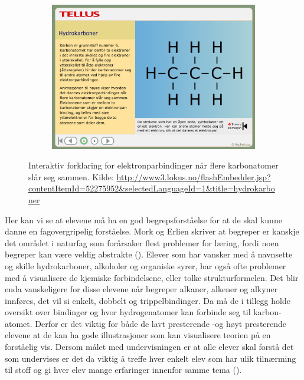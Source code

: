 \documentclass[main.tex]{subfiles}
\begin{document}
\begin{figure}[h!]
\begin{subfigure}{.5\textwidth}
    \end{subfigure}%
    \begin{subfigure}{.5\textwidth}
    \centering
    \includegraphics[scale = 0.199]{../figures/lokus4.png}
    \end{subfigure}
    \caption{Interaktiv forklaring for elektronparbindinger når flere karbonatomer slår seg sammen. Kilde: 
    \protect\url{http://www3.lokus.no/flashEmbedder.jsp?contentItemId=52275952&selectedLanguageId=1&title=hydrokarboner}}
    \label{fig:lokus}
\end{figure}

\hspace{-6mm}Her kan vi se at elevene må ha en god begrepsforståelse for at de skal kunne danne en fagovergripelig forståelse. Mork og Erlien skriver at begreper er kanskje det området i naturfag som forårsaker flest problemer for læring, fordi noen begreper kan være veldig abstrakte (). Elever som har vansker med å navnsette og skille hydrokarboner, alkoholer og organiske syrer, har også ofte problemer med å visualisere de kjemiske forbindelsene, eller tolke strukturformelen. Det blir enda vanskeligere for disse elevene når begreper alkaner, alkener og alkyner innføres, det vil si enkelt, dobbelt og trippelbindinger. Da må de i tillegg holde oversikt over bindinger og hvor hydrogenatomer kan forbinde seg til karbon-atomet. Derfor er det viktig for både de lavt presterende -og høyt presterende elevene at de kan ha gode illustrasjoner som kan visualisere teorien på en forståelig vis. Dersom målet med undervisningen er at alle elever skal forstå det som undervises er det da viktig å treffe hver enkelt elev som har ulik tilnærming til stoff og gi hver elev mange erfaringer innenfor samme tema (). \newline
\end{document}
